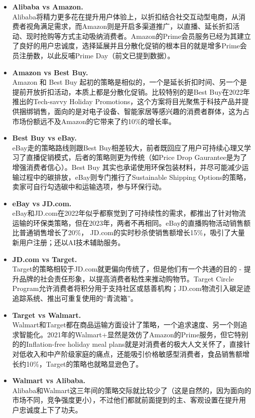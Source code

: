 \documentclass[12pt]{ctexart}
\begin{document}
\begin{itemize}
    \item \textbf{Alibaba vs Amazon.} \\
    Alibaba将精力更多花在提升用户体验上，以折扣结合社交互动型电商，从消费者视角满足需求，而Amazon则是开启多渠道推广，以直播、延长折扣活动、现时抢购等方式主动吸纳消费者。Amazon的Prime会员服务已经为其建立了良好的用户忠诚度，选择延展并且分散化促销的根本目的就是增多Prime会员注册数，以此反哺Prime Day（前文已提到数据）。
    \item \textbf{Amazon vs Best Buy.} \\
    Amazon 和 Best Buy 起初的策略是相似的，一个是延长折扣时间、另一个是提前开放折扣活动，本质上都是分散化促销。比较特别的是Best Buy在2022年推出的Tech-savvy Holiday Promotions，这个方案将目光聚焦于科技产品并提供捆绑销售，面向的是对电子设备、智能家居等感兴趣的消费者群体，这为占市场份额远不及Amazon的它带来了约10\%的增长率。
    \item \textbf{Best Buy vs eBay.} \\
    eBay走的策略路线则跟Best Buy相差较大，前者既回应了用户可持续心理又学习了直播促销模式，后者的策略则更为传统（如Price Drop Gaurantee是为了增强消费者信心）。Best Buy 其实也承诺使用环保包装材料，并尽可能减少运输过程中的碳排放，eBay则专门推行了Sustainable Shipping Options的策略，卖家可自行勾选碳中和运输选项，参与环保行动。
    \item \textbf{eBay vs JD.com.} \\
    eBay和JD.com在2022年似乎都察觉到了可持续性的需求，都推出了针对物流运输的环保类策略，但在2023年，两者不再相同。eBay的直播购物活动销售额比普通销售增长了20\%， JD.com的实时秒杀使销售额增长15\%，吸引了大量新用户注册；还以AI技术辅助服务。
    \item \textbf{JD.com vs Target.} \\
    Target的策略相较于JD.com就更偏向传统了，但是他们有一个共通的目的 - 提升品牌的社会责任形象，以提高消费者粘性来推动购物节。Target Circle Program允许消费者将积分用于支持社区或慈善机构；JD.com物流引入碳足迹追踪系统、推出可重复使用的“青流箱”。
    \item \textbf{Target vs Walmart.} \\
    Walmart和Target都在商品运输方面设计了策略，一个追求速度、另一个则追求智能化。2021年的Walmart+显然是效仿了Amazon的Prime服务，但它特别的的Inflation-free holiday meal plans就是对消费者的极大人文关怀了，直接针对低收入和中产阶级家庭的痛点，还能吸引价格敏感型消费者，食品销售额增长约10\%，Target的策略也就略显逊色了。
    \item \textbf{Walmart vs Alibaba.} \\
    Alibaba和Walmart这三年间的策略交际就比较少了（这是自然的，因为面向的市场不同，竞争强度更小），不过他们都就前面提到的主、客观设置在提升用户忠诚度上下了功夫。
\end{itemize}
\end{document}
